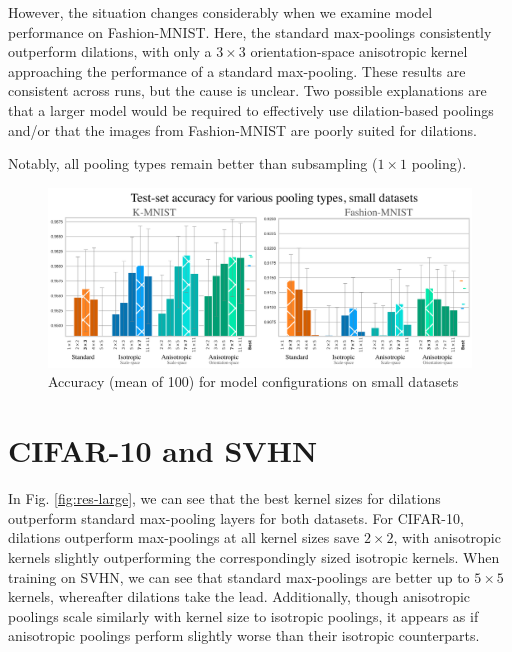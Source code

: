 \documentclass[a4paper, 12pt]{report}
\begin{document}
However, the situation changes considerably when we examine model performance on Fashion-MNIST. Here, the standard max-poolings consistently outperform dilations, with only a $3\times3$ orientation-space anisotropic kernel approaching the performance of a standard max-pooling. These results are consistent across runs, but the cause is unclear. Two possible explanations are that a larger model would be required to effectively use dilation-based poolings and/or that the images from Fashion-MNIST are poorly suited for dilations. 

Notably, all pooling types remain better than subsampling ($1\times1$ pooling).


\newpage
\begin{figure}[ht!]
	\center
  \includegraphics[width=1\textwidth]{figures/results-small.png}
  \caption{Accuracy (mean of 100) for model configurations on small datasets}
  \label{fig:res-small}
\end{figure}

\vspace{-0.7cm}
\section{CIFAR-10 and SVHN}
In Fig. \ref{fig:res-large}, we can see that the best kernel sizes for dilations outperform standard max-pooling layers for both datasets. For CIFAR-10, dilations outperform max-poolings at all kernel sizes save $2\times2$, with anisotropic kernels slightly outperforming the correspondingly sized isotropic kernels. When training on SVHN, we can see that standard max-poolings are better up to $5\times5$ kernels, whereafter dilations take the lead. Additionally, though anisotropic poolings scale similarly with kernel size to isotropic poolings, it appears as if anisotropic poolings perform slightly worse than their isotropic counterparts.

\end{document}
